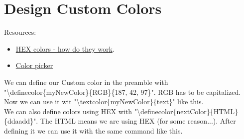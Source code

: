 \documentclass[12pt, titlepage]{article}
\begin{document}
\section{Design Custom Colors}
Resources: 
\begin{itemize}
    \item \href{https://hackernoon.com/hex-colors-how-do-they-work-d8cb935ac0f}{HEX colors - how do they work}.
    \item \href{https://coolors.co/655a7c-ab92bf-afc1d6-cef9f2-d6ca98}{Color picker}
\end{itemize}
We can define our Custom color in the preamble with \\
"\textbackslash definecolor\{myNewColor\}\{RGB\}\{187, 42, 97\}". RGB has to be capitalized.\\
Now we can use it wit "\textbackslash textcolor\{myNewColor\}\{text\}" like \textcolor{myNewColor}{this}.\\
We can also define colors using HEX with "\textbackslash definecolor\{nextColor\}\{HTML\}\{ddaadd\}". The HTML means we are using HEX {\tiny (for some reason...)}.
After defining it we can use it with the same command like \textcolor{nextColor}{this}.
\end{document}
